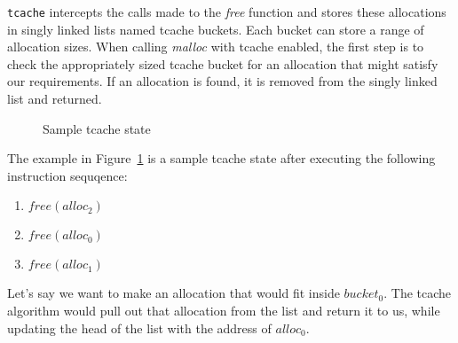 \documentclass{article}
\begin{document}
\texttt{tcache} intercepts the calls made to the \emph{free} function and stores these allocations in singly linked lists named tcache buckets. Each bucket can store a range of allocation sizes. When calling \emph{malloc} with tcache enabled, the first step is to check the appropriately sized tcache bucket for an allocation that might satisfy our requirements. If an allocation is found, it is removed from the singly linked list and returned.

\begin{figure}[ht]%
  \centering
  \caption{\label{fig:tcache} Sample tcache state}%
\end{figure}

The example in Figure~\ref{fig:tcache} is a sample tcache state after executing the following instruction sequqence:
\begin{enumerate}
  \item $free(alloc_{2})$
  \item $free(alloc_{0})$
  \item $free(alloc_{1})$
\end{enumerate}
Let's say we want to make an allocation that would fit inside $bucket_{0}$. The tcache algorithm would pull out that allocation from the list and return it to us, while updating the head of the list with the address of $alloc_{0}$.
\end{document}
